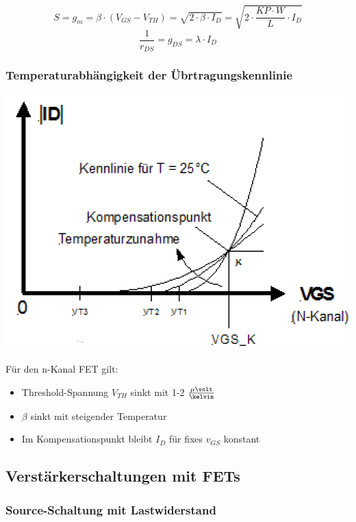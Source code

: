 $$ S = g_m = \beta \cdot (V_{GS} - V_{TH}) = \sqrt{2 \cdot \beta \cdot I_D} = \sqrt{ 2 \cdot \frac{KP \cdot W}{L} \cdot I_D} $$
$$ \frac{1}{r_{DS}} = g_{DS} = \lambda \cdot I_D $$


\subsubsection{Temperaturabhängigkeit der Übrtragungskennlinie}

\begin{minipage}[c]{0.4\columnwidth}
    \includegraphics[width= \columnwidth]{images/mos_fet_eingangskennlinie_temperatur.png}
\end{minipage}
\hfill
\begin{minipage}[c]{0.58\columnwidth}
    Für den n-Kanal FET gilt:
    \begin{itemize}
        \item Threshold-Spannung $V_{TH}$ sinkt mit 1-2 $\frac{\mathrm{\mu} \volt}{\kelvin}$
        \item $\beta$ sinkt mit steigender Temperatur
        \item Im Kompensationspunkt bleibt $I_D$ für fixes $v_{GS}$ konstant
    \end{itemize}
\end{minipage}

    
\subsection{Verstärkerschaltungen mit FETs}

\subsubsection{Source-Schaltung mit Lastwiderstand}

